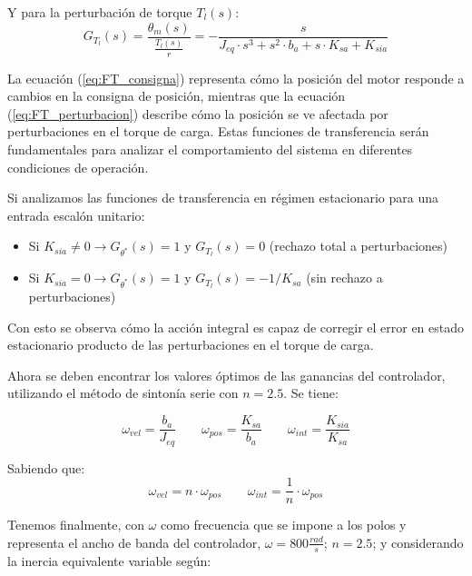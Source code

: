 \documentclass{article}
\begin{document}
Y para la perturbación de torque $T_l(s)$:
\begin{equation}
G_{T_l}(s) = \frac{\theta_m(s)}{\frac{T_l(s)}{r}} = -\frac{s}{J_{eq} \cdot s^3 + s^2 \cdot b_a + s \cdot K_{sa} + K_{sia}}
\label{eq:FT_perturbacion}
\end{equation}

La ecuación (\ref{eq:FT_consigna}) representa cómo la posición del motor responde a cambios en la consigna de posición, mientras que la ecuación (\ref{eq:FT_perturbacion}) describe cómo la posición se ve afectada por perturbaciones en el torque de carga. Estas funciones de transferencia serán fundamentales para analizar el comportamiento del sistema en diferentes condiciones de operación.

Si analizamos las funciones de transferencia en régimen estacionario para una entrada escalón unitario:

\begin{itemize}
\item Si $K_{sia} \neq 0 \rightarrow G_{\theta^*}(s) = 1$ y $G_{T_l}(s) = 0$ (rechazo total a perturbaciones)
\item Si $K_{sia} = 0 \rightarrow G_{\theta^*}(s) = 1$ y $G_{T_l}(s) = -1/K_{sa}$ (sin rechazo a perturbaciones)
\end{itemize}

Con esto se observa cómo la acción integral es capaz de corregir el error en estado estacionario producto de las 
perturbaciones en el torque de carga.

Ahora se deben encontrar los valores óptimos de las ganancias del controlador, utilizando el método de sintonía serie con 
$n=2.5$. Se tiene:

\begin{equation}
\omega_{vel} = \frac{b_a}{J_{eq}} \qquad \omega_{pos} = \frac{K_{sa}}{b_a} \qquad \omega_{int} = \frac{K_{sia}}{K_{sa}}
\label{eq:frecuencias_caracteristicas}
\end{equation}

Sabiendo que:
\begin{equation}
\omega_{vel} = n \cdot \omega_{pos} \qquad \omega_{int} = \frac{1}{n} \cdot \omega_{pos}
\label{eq:relacion_frecuencias}
\end{equation}

Tenemos finalmente, con $\omega$ como frecuencia que se impone a los polos y representa el ancho de banda del controlador, 
$\omega = 800 \frac{rad}{s}$; $n = 2.5$; y considerando la inercia equivalente variable según:
\end{document}
